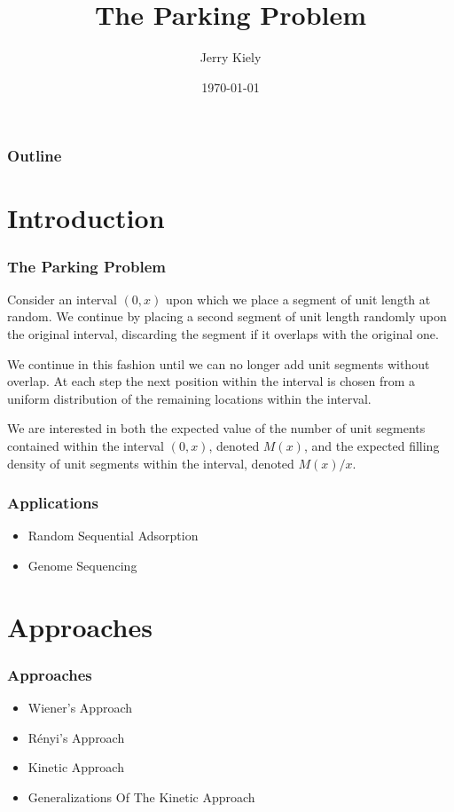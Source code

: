 \documentclass{beamer}
\title{The Parking Problem}
\author{Jerry Kiely}
\institute{School of Mathematical Sciences\\
	Dublin Institute of Technology\\
	Dublin 8\\
	Ireland}
\date{\today}
\begin{document}
\begin{frame}
\titlepage
\end{frame}

\begin{frame}
    \frametitle{Outline}
    \tableofcontents
\end{frame}




\section{Introduction}
\begin{frame}
    \frametitle{The Parking Problem}
    Consider an interval $(0, x)$ upon which we place a segment of unit length 
    at random. We continue by placing a second segment of unit length randomly 
    upon the original interval, discarding the segment if it overlaps with the 
    original one.
    
    We continue in this fashion until we can no longer add unit segments without 
    overlap. At each step the next position within the interval is chosen from a 
    uniform distribution of the remaining locations within the interval.
    
    We are interested in both the expected value of the number of unit segments 
    contained within the interval $(0, x)$, denoted $M(x)$, and the expected 
    filling density of unit segments within the interval, denoted $M(x) / x$.
\end{frame}

\begin{frame}
    \frametitle{Applications}
    \begin{itemize}
        \item Random Sequential Adsorption
        \item Genome Sequencing
    \end{itemize}
\end{frame}




\section{Approaches}
\begin{frame}
    \frametitle{Approaches}
    \begin{itemize}
        \item Wiener's Approach
        \item R\'enyi's Approach
        \item Kinetic Approach
        \item Generalizations Of The Kinetic Approach
    \end{itemize}
\end{frame}
\end{document}
